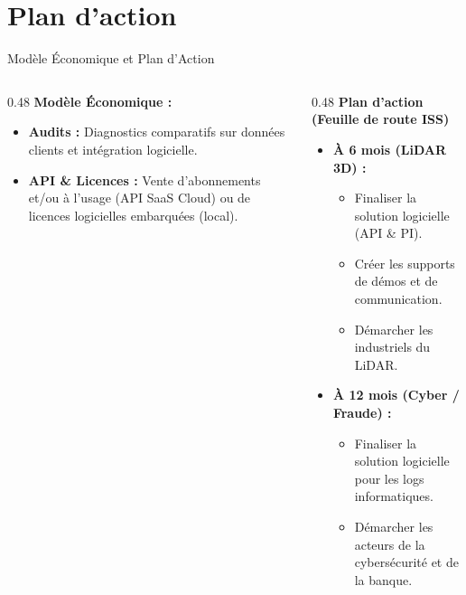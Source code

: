 \documentclass[A4,svgnames,9pt,aspectratio=169]{beamer}
\begin{document}
\section{Plan d'action}
\begin{frame}{Modèle Économique et Plan d'Action}
    \begin{columns}[T]
        \begin{column}{0.48\textwidth}
            \textbf{\bleu Modèle Économique :}
            \begin{itemize}
                \item \textbf{Audits :} Diagnostics comparatifs sur données clients et intégration logicielle.
                \item \textbf{API \& Licences :} Vente d'abonnements et/ou à l'usage (API SaaS Cloud) ou de licences logicielles embarquées (local).
            \end{itemize}
        \end{column}
        
        \begin{column}{0.48\textwidth}
            \textbf{\bleu Plan d'action (Feuille de route ISS)}
            \begin{itemize}
                \item \textbf{À 6 mois (LiDAR 3D) :}
                \begin{itemize}
                    \item Finaliser la solution logicielle (API \& PI).
                    \item Créer les supports de démos et de communication.
                    \item Démarcher les industriels du LiDAR.
                \end{itemize}
                \item \textbf{À 12 mois (Cyber / Fraude) :}
                \begin{itemize}
                    \item Finaliser la solution logicielle pour les logs informatiques.
                    \item Démarcher les acteurs de la cybersécurité et de la banque.
                \end{itemize}
            \end{itemize}
        \end{column}
    \end{columns}
\end{frame}
\end{document}
